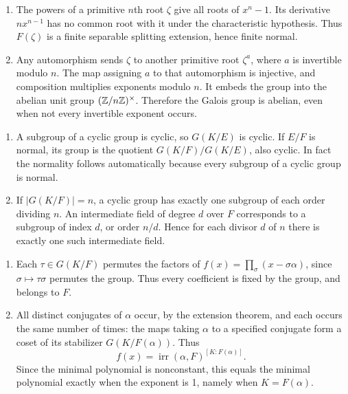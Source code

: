 \begin{enumerate}[label=(\alph*)]
\item The powers of a primitive $n$th root $\zeta$ give all roots of $x^n-1$. Its derivative $nx^{n-1}$ has no common root with it under the characteristic hypothesis. Thus $F(\zeta)$ is a finite separable splitting extension, hence finite normal.
\item Any automorphism sends $\zeta$ to another primitive root $\zeta^a$, where $a$ is invertible modulo $n$. The map assigning $a$ to that automorphism is injective, and composition multiplies exponents modulo $n$. It embeds the group into the abelian unit group $(\mathbb{Z}/n\mathbb{Z})^\times$. Therefore the Galois group is abelian, even when not every invertible exponent occurs.
\end{enumerate}

\begin{enumerate}[label=(\alph*)]
\item A subgroup of a cyclic group is cyclic, so $G(K/E)$ is cyclic. If $E/F$ is normal, its group is the quotient $G(K/F)/G(K/E)$, also cyclic. In fact the normality follows automatically because every subgroup of a cyclic group is normal.
\item If $|G(K/F)|=n$, a cyclic group has exactly one subgroup of each order dividing $n$. An intermediate field of degree $d$ over $F$ corresponds to a subgroup of index $d$, or order $n/d$. Hence for each divisor $d$ of $n$ there is exactly one such intermediate field.
\end{enumerate}

\begin{enumerate}[label=(\alph*)]
\item Each $\tau\in G(K/F)$ permutes the factors of $f(x)=\prod_\sigma(x-\sigma\alpha)$, since $\sigma\mapsto\tau\sigma$ permutes the group. Thus every coefficient is fixed by the group, and belongs to $F$.
\item All distinct conjugates of $\alpha$ occur, by the extension theorem, and each occurs the same number of times: the maps taking $\alpha$ to a specified conjugate form a coset of its stabilizer $G(K/F(\alpha))$. Thus
\[f(x)=\operatorname{irr}(\alpha,F)^{[K:F(\alpha)]}.\]
Since the minimal polynomial is nonconstant, this equals the minimal polynomial exactly when the exponent is 1, namely when $K=F(\alpha)$.
\end{enumerate}

